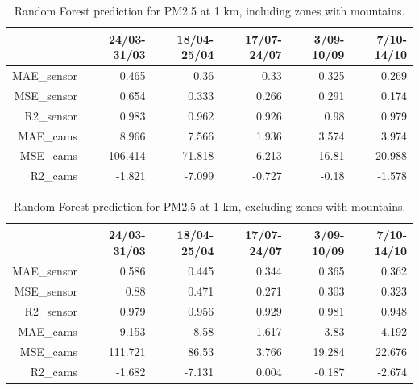 \begin{table}[H]
\begin{tabular}{rrrrrr}
\hline
     &   24/03-31/03 &   18/04-25/04 &   17/07-24/07 &   3/09-10/09 &   7/10-14/10 \\
\hline
   MAE\_sensor   &            0.465 &            0.36  &            0.33  &            0.325 &            0.269 \\
  MSE\_sensor   &            0.654 &            0.333 &            0.266 &            0.291 &            0.174 \\
   R2\_sensor    &            0.983 &            0.962 &            0.926 &            0.98  &            0.979 \\
   MAE\_cams     &            8.966 &            7.566 &            1.936 &            3.574 &            3.974 \\
  MSE\_cams     &          106.414 &           71.818 &            6.213 &           16.81  &           20.988 \\
   R2\_cams      &           -1.821 &           -7.099 &           -0.727 &           -0.18  &           -1.578 \\
\hline
\end{tabular}
\caption{Random Forest prediction for PM2.5 at 1 km, including zones with mountains.}
\end{table}


\begin{table}[H]
\begin{tabular}{rrrrrr}
\hline
      &   24/03-31/03 &   18/04-25/04 &   17/07-24/07 &   3/09-10/09 &   7/10-14/10 \\
\hline
  MAE\_sensor   &            0.586 &            0.445 &            0.344 &            0.365 &            0.362 \\
   MSE\_sensor   &            0.88  &            0.471 &            0.271 &            0.303 &            0.323 \\
  R2\_sensor    &            0.979 &            0.956 &            0.929 &            0.981 &            0.948 \\
  MAE\_cams     &            9.153 &            8.58  &            1.617 &            3.83  &            4.192 \\
   MSE\_cams     &          111.721 &           86.53  &            3.766 &           19.284 &           22.676 \\
  R2\_cams      &           -1.682 &           -7.131 &            0.004 &           -0.187 &           -2.674 \\
\hline
\end{tabular}
\caption{Random Forest prediction for PM2.5 at 1 km, excluding zones with mountains.}
\end{table}


